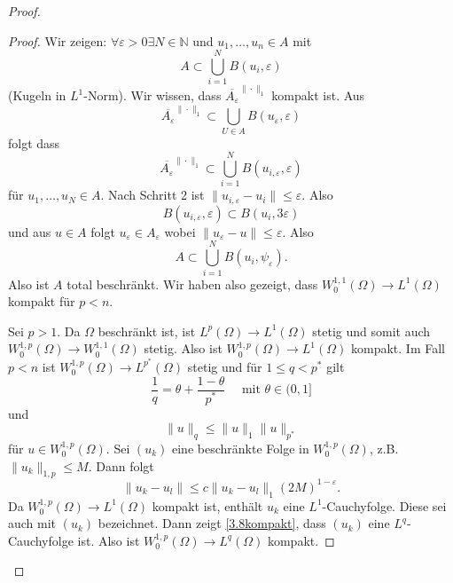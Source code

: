 \documentclass[
paper=a4,
bibtotocnumbered,
liststotocnumbered,
tablecaptionabove,
pointlessnumbers,
twoside,
openright,
10pt
]
{report}
\theoremstyle{definition}
\numberwithin{equation}{chapter}
\begin{document}
\begin{proof}
\begin{proof}
Wir zeigen: $\forall \varepsilon >0 \exists N \in \mathbb N$ und $u_1, \ldots, u_n \in A$ mit
\begin{equation}
 A \subset \bigcup_{i=1}^N B(u_i, \varepsilon)
\end{equation}
(Kugeln in $L^1$-Norm). Wir wissen, dass $\overline{A_\varepsilon}^{\|\cdot \|_1}$ kompakt ist. Aus
\begin{equation}
 \overline{A_\varepsilon}^{\|\cdot\|_1} \subset\bigcup_{U\in A} B(u_\varepsilon, \varepsilon)
\end{equation}
folgt dass
\begin{equation}
 \overline{A_\varepsilon}^{\|\cdot \|_1} \subset \bigcup_{i=1}^N B(u_{i,\varepsilon}, \varepsilon)
\end{equation}
für $u_1,\ldots, u_N \in A$. Nach Schritt 2 ist $\| u_{i,\varepsilon} - u_i \| \le \varepsilon$. Also
\begin{equation}
 B(u_{i,\varepsilon}, \varepsilon) \subset B(u_i, 3\varepsilon)
\end{equation}
und aus $u\in A$ folgt $u_\varepsilon \in A_\varepsilon$ wobei $\| u_\varepsilon - u\| \le \varepsilon$. Also
\begin{equation}
 A\subset \bigcup_{i=1}^N B(u_i, \psi_\varepsilon).
\end{equation}
Also ist $A$ total beschränkt. Wir haben also gezeigt, dass $W_0^{1,1}(\Omega) \to L^1(\Omega)$ kompakt für $p<n$.

Sei $p>1$.  Da $\Omega$ beschränkt ist, ist $L^p(\Omega)\to L^1(\Omega)$ stetig und somit auch 
$W_0^{1,p}(\Omega) \to W_0^{1,1}(\Omega)$ stetig. Also ist $W_0^{1,p}(\Omega) \to L^{1}(\Omega)$ kompakt. Im Fall $p<n$ ist $W_0^{1,p}(\Omega) \to L^{p^*}(\Omega)$ stetig und für $1\le q<p^*$ gilt
\begin{equation}
 \frac{1}{q} = \theta + \frac{1-\theta}{p^*} \quad \text{ mit } \theta\in (0,1]
\end{equation}
und 
\begin{equation}
 \| u\|_q \le \|u\|_1 \| u\|_{p^*}
\end{equation}
für $u\in W_0^{1,p}(\Omega)$.  Sei $(u_k)$ eine beschränkte Folge in $W_0^{1,p}(\Omega)$, z.B. $\|u_k\|_{1,p}\le M$. Dann folgt
\begin{equation}\label{3.8kompakt}
 \|u_k - u_l\| \le c \|u_k - u_l\|_1 (2M)^{1-\varepsilon}.
\end{equation}
Da $W_0^{1,p}(\Omega) \to L^1(\Omega)$ kompakt ist, enthält $u_k$ eine $L^1$-Cauchyfolge. Diese sei auch mit $(u_k)$ bezeichnet. Dann zeigt \eqref{3.8kompakt}, dass $(u_k)$ eine $L^q$-Cauchyfolge ist. Also ist $W_0^{1,p}(\Omega) \to L^q(\Omega)$ kompakt.


\end{proof}
\end{proof}
\end{document}
